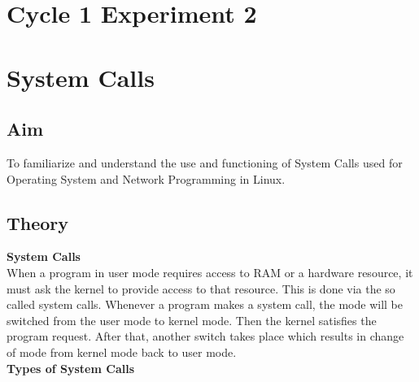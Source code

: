\section*{Cycle 1 Experiment 2}

\section{\Large{System Calls}}

\subsection{Aim}
\large To familiarize and understand the use and functioning of System Calls used for Operating System and Network Programming in Linux.

\subsection{Theory}
\textbf{System Calls }\vspace{2mm}\\
When a program in user mode requires access to RAM or a hardware resource, it must ask the kernel to provide access to that resource. This is done via the so called system calls. Whenever a program makes a system call, the mode will be switched from the user mode to kernel mode. Then the kernel satisfies the program request. After that, another switch takes place which results in change of mode from kernel mode back to user mode.\vspace{2mm}
\\
\large{\textbf{Types of System Calls}}
